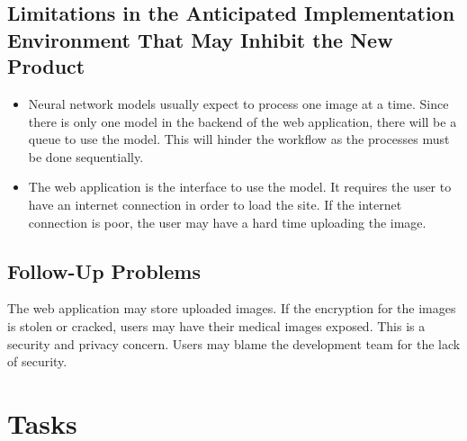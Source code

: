 \documentclass[12pt]{article}
\begin{document}
\subsection{Limitations in the Anticipated Implementation Environment That May
Inhibit the New Product}
\begin{itemize}
    \item Neural network models usually expect to process one image at a time. Since there is only 
    one model in the backend of the web application, there will be a queue to use the model. This 
    will hinder the workflow as the processes must be done sequentially.
    \item The web application is the interface to use the model. It requires the user to have an 
    internet connection in order to load the site. If the internet connection is poor, the user 
    may have a hard time uploading the image.
\end{itemize}

\subsection{Follow-Up Problems}
The web application may store uploaded images. If the encryption for the images is stolen or 
cracked, users may have their medical images exposed. This is a security and privacy concern. 
Users may blame the development team for the lack of security.

\section{Tasks}
\end{document}

